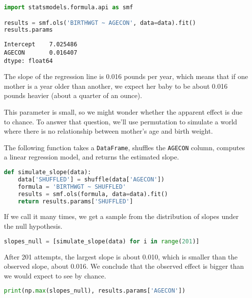 \begin{lstlisting}[language=Python,style=source]
import statsmodels.formula.api as smf

results = smf.ols('BIRTHWGT ~ AGECON', data=data).fit()
results.params
\end{lstlisting}

\begin{lstlisting}[style=output]
Intercept    7.025486
AGECON       0.016407
dtype: float64
\end{lstlisting}

The slope of the regression line is 0.016 pounds per year, which means
that if one mother is a year older than another, we expect her baby to
be about 0.016 pounds heavier (about a quarter of an ounce).

This parameter is small, so we might wonder whether the apparent effect
is due to chance. To answer that question, we'll use permutation to
simulate a world where there is no relationship between mother's age and
birth weight.

\pagebreak

The following function takes a \passthrough{\lstinline!DataFrame!},
shuffles the \passthrough{\lstinline!AGECON!} column, computes a linear
regression model, and returns the estimated slope.

\begin{lstlisting}[language=Python,style=source]
def simulate_slope(data):
    data['SHUFFLED'] = shuffle(data['AGECON'])
    formula = 'BIRTHWGT ~ SHUFFLED'
    results = smf.ols(formula, data=data).fit()
    return results.params['SHUFFLED']
\end{lstlisting}

If we call it many times, we get a sample from the distribution of
slopes under the null hypothesis.

\begin{lstlisting}[language=Python,style=source]
slopes_null = [simulate_slope(data) for i in range(201)]
\end{lstlisting}

After 201 attempts, the largest slope is about 0.010, which is smaller
than the observed slope, about 0.016. We conclude that the observed
effect is bigger than we would expect to see by chance.

\begin{lstlisting}[language=Python,style=source]
print(np.max(slopes_null), results.params['AGECON'])
\end{lstlisting}

